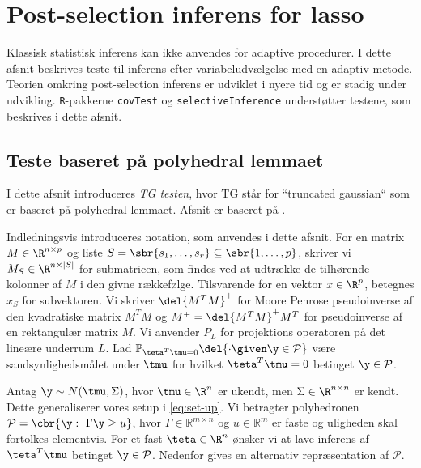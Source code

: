 \section{Post-selection inferens for lasso}
Klassisk statistisk inferens kan ikke anvendes for adaptive procedurer.
I dette afsnit beskrives teste til inferens efter variabeludvælgelse med en adaptiv metode.
Teorien omkring post-selection inferens er udviklet i nyere tid og er stadig under udvikling.
\texttt{R}-pakkerne \texttt{covTest} og \texttt{selectiveInference} understøtter testene, som beskrives i dette afsnit.



\subsection{Teste baseret på polyhedral lemmaet} \label{subsec:teste_polyhedron}
I dette afsnit introduceres \textit{TG testen}, hvor TG står for ``truncated gaussian`` som er baseret på polyhedral lemmaet. 
Afsnit er baseret på \citep{post_inference}.

Indledningsvis introduceres notation, som anvendes i dette afsnit.
For en matrix \(M \in \R^{n \times p}\) og liste \(S = \sbr{s_1, \ldots, s_r} \subseteq \sbr{1, \ldots, p}\), skriver vi \(M_S \in \R^{n \times \vert S \vert}\) for submatricen, som findes ved at udtrække de tilhørende kolonner af \(M\) i den givne rækkefølge.
Tilsvarende for en vektor \(x \in \R^p\), betegnes \(x_S\) for subvektoren.
Vi skriver \(\del{M^T M}^+\) for Moore Penrose pseudoinverse af den kvadratiske matrix \(M^T M\) og \(M^+ = \del{M^T M}^+ M^T\) for pseudoinverse af en rektangulær matrix \(M\).
Vi anvender \(P_L\) for projektions operatoren på det lineære underrum \(L\).
Lad \(\mathbb{P}_{\teta^T \tmu = 0} \del{\cdot \given \y \in \mathcal{P}} \) være sandsynlighedsmålet under \(\tmu\) for hvilket \(\teta^T \tmu =0 \) betinget \(\y \in \mathcal{P}\). 

Antag \(\y \sim N(\tmu, \Sigma)\), hvor \(\tmu \in \R^{n}\) er ukendt, men \(\Sigma \in \R^{n \times n}\) er kendt.
Dette generaliserer vores setup i \eqref{eq:set-up}.
Vi betragter polyhedronen \(\mathcal{P} = \cbr{\y : \ \Gamma \y \geq u}\), hvor \(\Gamma \in \mathbb{R}^{m \times n}\) og \(u \in \mathbb{R}^m\) er faste og uligheden skal fortolkes elementvis.
For et fast \(\teta \in \R^n\) ønsker vi at lave inferens af \(\teta^T \tmu\) betinget \(\y \in \mathcal{P}\).
Nedenfor gives en alternativ repræsentation af \(\mathcal{P}\).



